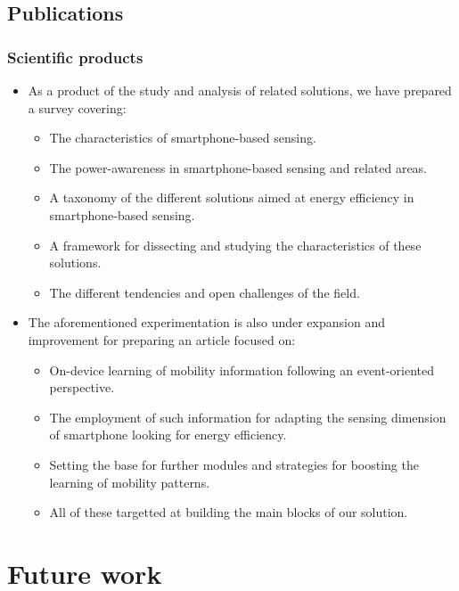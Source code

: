 \documentclass[compress,9pt,xcolor={dvipsnames,table}]{beamer}
\begin{document}
\subsection{Publications}
\begin{frame}[t]\frametitle{Scientific products}
\begin{itemize}
  \item As a product of the study and analysis of related solutions, we have prepared a survey covering:
  \begin{itemize}
    \item The characteristics of smartphone-based sensing.
    \item The power-awareness in smartphone-based sensing and related areas.
    \item A taxonomy of the different solutions aimed at energy efficiency in smartphone-based sensing.
    \item A framework for dissecting and studying the characteristics of these solutions.
    \item The different tendencies and open challenges of the field.
  \end{itemize}
  \item The aforementioned experimentation is also under expansion and improvement for preparing an article focused on:
  \begin{itemize}
    \item On-device learning of mobility information following an event-oriented perspective.
    \item The employment of such information for adapting the sensing dimension of smartphone looking for energy efficiency.
    \item Setting the base for further modules and strategies for boosting the learning of mobility patterns.
    \item All of these targetted at building the main blocks of our solution.
  \end{itemize}
\end{itemize}
\end{frame}


\section{Future work}
\end{document}
